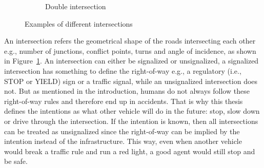 \begin{figure}[h]
\begin{subfigure}[t]{0.48\columnwidth}
		\caption{Double intersection}
	\end{subfigure}

	\caption{Examples of different intersections}
	\label{fig:example_intersections}

\end{figure}
An intersection refers the geometrical shape of the roads intersecting each other e.g., number of junctions, conflict points, turns and angle of incidence, as shown in Figure~\ref{fig:example_intersections}. 
An intersection can either be signalized or unsignalized, a signalized intersection has something to define the right-of-way e.g., a regulatory (i.e., STOP or YIELD) sign or a traffic signal, while an unsignalized intersection does not. But as mentioned in the introduction, humans do not always follow these right-of-way rules and therefore end up in accidents. That is why this thesis defines the intentions as what other vehicle will do in the future: stop, slow down or drive through the intersection. If the intention is known, then all intersections can be treated as unsignalized since the right-of-way can be implied by the intention instead of the infrastructure. This way, even when another vehicle would break a traffic rule and run a red light, a good agent would still stop and be safe. 

